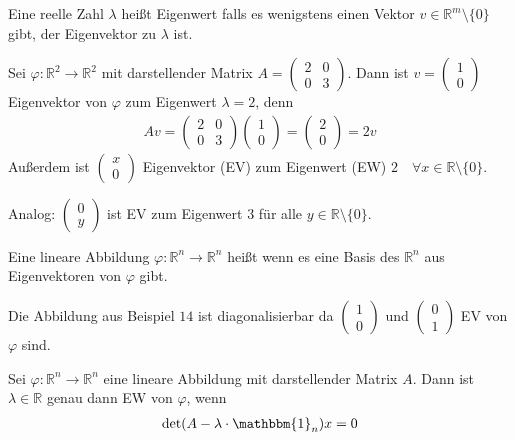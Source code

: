 Eine reelle Zahl $\lambda$ heißt Eigenwert falls es wenigstens einen Vektor $v \in \mathbb{R}^m \setminus \{0\}$ gibt, der Eigenvektor zu $\lambda$ ist.

Sei $\varphi : \mathbb{R}^2 \rightarrow \mathbb{R}^2$ mit darstellender Matrix $A = \begin{pmatrix} 2 & 0 \\ 0 & 3 \end{pmatrix}$. Dann ist $v = \begin{pmatrix}1\\0\end{pmatrix}$ Eigenvektor von $\varphi$ zum Eigenwert $\lambda = 2$, denn
\begin{align*}
	Av = \begin{pmatrix}2 & 0 \\ 0 & 3\end{pmatrix}\begin{pmatrix}1\\0\end{pmatrix} = \begin{pmatrix}2\\0\end{pmatrix} = 2v
\end{align*}
Außerdem ist $\begin{pmatrix}x\\0\end{pmatrix}$ Eigenvektor (EV) zum Eigenwert (EW) $2 \quad\forall x \in \mathbb{R} \setminus \{0\}$.

Analog: $\begin{pmatrix}0\\y\end{pmatrix}$ ist EV zum Eigenwert $3$ für alle $y \in \mathbb{R} \setminus \{0\}$.

Eine lineare Abbildung $\varphi : \mathbb{R}^n \rightarrow \mathbb{R}^n$ heißt  wenn es eine Basis des $\mathbb{R}^n$ aus Eigenvektoren von $\varphi$ gibt.

Die Abbildung aus Beispiel $14$ ist diagonalisierbar da $\begin{pmatrix}1\\0\end{pmatrix}$ und $\begin{pmatrix}0\\1\end{pmatrix}$ EV von $\varphi$ sind.

Sei $\varphi : \mathbb{R}^n \rightarrow \mathbb{R}^n$ eine lineare Abbildung mit darstellender Matrix $A$. Dann ist $\lambda \in \mathbb{R}$ genau dann EW von $\varphi$, wenn
\begin{align*}
	\text{det}(A - \lambda \cdot \mathbbm{1}_n)x = 0
\end{align*}

